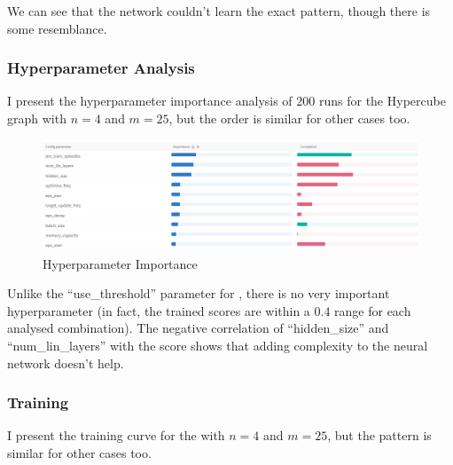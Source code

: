 We can see that the network couldn't learn the exact pattern, though there is some resemblance.


\subsubsection{Hyperparameter Analysis}

I present the hyperparameter importance analysis of $200$ runs for the Hypercube graph with $n=4$ and $m=25$, but the order is similar for other cases too.

\begin{figure}[hbt!] \label{graphical-two-choice-hyperparameter-importance}
    \centering
    \includegraphics[scale=0.4]{Chapter4/Figs/graphical_two_choice_hypercube_4_25_importance.png}
    \caption{\GraphicalTwoChoice Hyperparameter Importance \cite{biewald2020wandb}}
\end{figure}


Unlike the ``use\_threshold'' parameter for \TwoThinning, there is no very important hyperparameter (in fact, the trained scores are within a $0.4$ range for each analysed combination). The negative correlation of ``hidden\_size'' and ``num\_lin\_layers'' with the score shows that adding complexity to the neural network doesn't help.


\subsubsection{Training}

I present the training curve for the \HypercubeGraph with $n=4$ and $m=25$, but the pattern is similar for other cases too.



